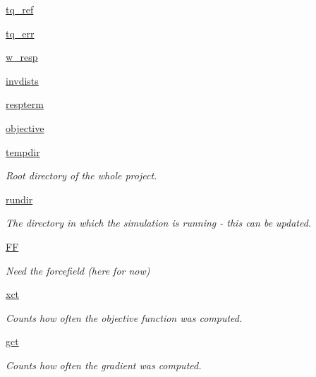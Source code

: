 \begin{DoxyCompactItemize}
\item 
\hyperlink{classforcebalance_1_1abinitio_1_1AbInitio_aadda7244869b583a4533317615c421e1}{tq\-\_\-ref}
\item 
\hyperlink{classforcebalance_1_1abinitio_1_1AbInitio_ae60e834d5b5bf13f8fb70d403a97db28}{tq\-\_\-err}
\item 
\hyperlink{classforcebalance_1_1abinitio_1_1AbInitio_a176a442bd340d2f9b54319e76feb46ae}{w\-\_\-resp}
\item 
\hyperlink{classforcebalance_1_1abinitio_1_1AbInitio_aa01ee600ba0f429ffc81135af9d8109b}{invdists}
\item 
\hyperlink{classforcebalance_1_1abinitio_1_1AbInitio_a689e3849518b33539442a473a41ed32d}{respterm}
\item 
\hyperlink{classforcebalance_1_1abinitio_1_1AbInitio_acbbd447b9f66bc4699992f3b64bb256d}{objective}
\item 
\hyperlink{classforcebalance_1_1target_1_1Target_aa1f01b5b78db253b5b66384ed11ed193}{tempdir}
\begin{DoxyCompactList}\small\item\em Root directory of the whole project. \end{DoxyCompactList}\item 
\hyperlink{classforcebalance_1_1target_1_1Target_a6872de5b2d4273b82336ea5b0da29c9e}{rundir}
\begin{DoxyCompactList}\small\item\em The directory in which the simulation is running -\/ this can be updated. \end{DoxyCompactList}\item 
\hyperlink{classforcebalance_1_1target_1_1Target_a38a37919783141ea37fdcf8b00ce0aaf}{F\-F}
\begin{DoxyCompactList}\small\item\em Need the forcefield (here for now) \end{DoxyCompactList}\item 
\hyperlink{classforcebalance_1_1target_1_1Target_aad2e385cfbf7b4a68f1c2cb41133fe82}{xct}
\begin{DoxyCompactList}\small\item\em Counts how often the objective function was computed. \end{DoxyCompactList}\item 
\hyperlink{classforcebalance_1_1target_1_1Target_aa625ac88c6744eb14ef281d9496d0dbb}{gct}
\begin{DoxyCompactList}\small\item\em Counts how often the gradient was computed. \end{DoxyCompactList}\item 

\end{DoxyCompactItemize}
